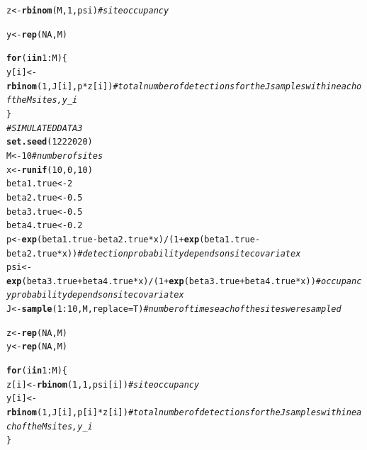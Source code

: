 \documentclass[12pt]{article}\usepackage[]{graphicx}\usepackage[]{color}
\makeatletter
\newcommand{\hlnum}[1]{\textcolor[rgb]{0.686,0.059,0.569}{#1}}%
\newcommand{\hlcom}[1]{\textcolor[rgb]{0.678,0.584,0.686}{\textit{#1}}}%
\newcommand{\hlopt}[1]{\textcolor[rgb]{0,0,0}{#1}}%
\newcommand{\hlstd}[1]{\textcolor[rgb]{0.345,0.345,0.345}{#1}}%
\newcommand{\hlkwa}[1]{\textcolor[rgb]{0.161,0.373,0.58}{\textbf{#1}}}%
\newcommand{\hlkwb}[1]{\textcolor[rgb]{0.69,0.353,0.396}{#1}}%
\newcommand{\hlkwc}[1]{\textcolor[rgb]{0.333,0.667,0.333}{#1}}%
\newcommand{\hlkwd}[1]{\textcolor[rgb]{0.737,0.353,0.396}{\textbf{#1}}}%
\newenvironment{kframe}{%
 \def\at@end@of@kframe{}%
 \ifinner\ifhmode%
  \def\at@end@of@kframe{\end{minipage}}%
  \begin{minipage}{\columnwidth}%
 \fi\fi%
 \def\FrameCommand##1{\hskip\@totalleftmargin \hskip-\fboxsep
 \colorbox{shadecolor}{##1}\hskip-\fboxsep
     \hskip-\linewidth \hskip-\@totalleftmargin \hskip\columnwidth}%
 \MakeFramed {\advance\hsize-\width
   \@totalleftmargin\z@ \linewidth\hsize
   \@setminipage}}%
 {\par\unskip\endMakeFramed%
 \at@end@of@kframe}
\newenvironment{knitrout}{}{} %
\newcommand{\hlnum}[1]{\textcolor[rgb]{0.686,0.059,0.569}{#1}}%
\newcommand{\hlcom}[1]{\textcolor[rgb]{0.678,0.584,0.686}{\textit{#1}}}%
\newcommand{\hlopt}[1]{\textcolor[rgb]{0,0,0}{#1}}%
\newcommand{\hlstd}[1]{\textcolor[rgb]{0.345,0.345,0.345}{#1}}%
\newcommand{\hlkwa}[1]{\textcolor[rgb]{0.161,0.373,0.58}{\textbf{#1}}}%
\newcommand{\hlkwb}[1]{\textcolor[rgb]{0.69,0.353,0.396}{#1}}%
\newcommand{\hlkwc}[1]{\textcolor[rgb]{0.333,0.667,0.333}{#1}}%
\newcommand{\hlkwd}[1]{\textcolor[rgb]{0.737,0.353,0.396}{\textbf{#1}}}%
\newenvironment{kframe}{%
 \def\at@end@of@kframe{}%
 \ifinner\ifhmode%
  \def\at@end@of@kframe{\end{minipage}}%
  \begin{minipage}{\columnwidth}%
 \fi\fi%
 \def\FrameCommand##1{\hskip\@totalleftmargin \hskip-\fboxsep
 \colorbox{shadecolor}{##1}\hskip-\fboxsep
     \hskip-\linewidth \hskip-\@totalleftmargin \hskip\columnwidth}%
 \MakeFramed {\advance\hsize-\width
   \@totalleftmargin\z@ \linewidth\hsize
   \@setminipage}}%
 {\par\unskip\endMakeFramed%
 \at@end@of@kframe}
\newenvironment{knitrout}{}{} %
\makeatother
\begin{document}
\begin{knitrout}
\begin{kframe}
\begin{alltt}
\hlstd{z} \hlkwb{<-} \hlkwd{rbinom}\hlstd{(M,} \hlnum{1}\hlstd{, psi)} \hlcom{# site occupancy}

\hlstd{y} \hlkwb{<-} \hlkwd{rep}\hlstd{(}\hlnum{NA}\hlstd{, M)}

\hlkwa{for}\hlstd{(i} \hlkwa{in} \hlnum{1}\hlopt{:}\hlstd{M)\{}
  \hlstd{y[i]} \hlkwb{<-} \hlkwd{rbinom}\hlstd{(}\hlnum{1}\hlstd{, J[i], p}\hlopt{*}\hlstd{z[i])} \hlcom{# total number of detections for the J samples within each of the M sites, y_i}
\hlstd{\}}
\hlcom{#SIMULATED DATA 3}
\hlkwd{set.seed}\hlstd{(}\hlnum{1222020}\hlstd{)}
\hlstd{M} \hlkwb{<-} \hlnum{10} \hlcom{# number of sites}
\hlstd{x} \hlkwb{<-} \hlkwd{runif}\hlstd{(}\hlnum{10}\hlstd{,} \hlnum{0}\hlstd{,} \hlnum{10}\hlstd{)}
\hlstd{beta1.true} \hlkwb{<-} \hlnum{2}
\hlstd{beta2.true} \hlkwb{<-} \hlnum{0.5}
\hlstd{beta3.true} \hlkwb{<-} \hlnum{0.5}
\hlstd{beta4.true} \hlkwb{<-} \hlnum{0.2}
\hlstd{p} \hlkwb{<-} \hlkwd{exp}\hlstd{(beta1.true} \hlopt{-} \hlstd{beta2.true}\hlopt{*}\hlstd{x)}\hlopt{/}\hlstd{(}\hlnum{1} \hlopt{+} \hlkwd{exp}\hlstd{(beta1.true} \hlopt{-} \hlstd{beta2.true}\hlopt{*}\hlstd{x))} \hlcom{# detection probability depends on site covariate x}
\hlstd{psi} \hlkwb{<-} \hlkwd{exp}\hlstd{(beta3.true} \hlopt{+} \hlstd{beta4.true}\hlopt{*}\hlstd{x)}\hlopt{/}\hlstd{(}\hlnum{1} \hlopt{+} \hlkwd{exp}\hlstd{(beta3.true} \hlopt{+} \hlstd{beta4.true}\hlopt{*}\hlstd{x))} \hlcom{# occupancy probability depends on site covariate x}
\hlstd{J} \hlkwb{<-} \hlkwd{sample}\hlstd{(}\hlnum{1}\hlopt{:}\hlnum{10}\hlstd{, M,} \hlkwc{replace} \hlstd{= T)} \hlcom{# number of times each of the sites were sampled}

\hlstd{z} \hlkwb{<-} \hlkwd{rep}\hlstd{(}\hlnum{NA}\hlstd{, M)}
\hlstd{y} \hlkwb{<-} \hlkwd{rep}\hlstd{(}\hlnum{NA}\hlstd{, M)}

\hlkwa{for}\hlstd{(i} \hlkwa{in} \hlnum{1}\hlopt{:}\hlstd{M)\{}
  \hlstd{z[i]} \hlkwb{<-} \hlkwd{rbinom}\hlstd{(}\hlnum{1}\hlstd{,} \hlnum{1}\hlstd{, psi[i])} \hlcom{#site occupancy}
  \hlstd{y[i]} \hlkwb{<-} \hlkwd{rbinom}\hlstd{(}\hlnum{1}\hlstd{, J[i], p[i]}\hlopt{*}\hlstd{z[i])} \hlcom{# total number of detections for the J samples within each of the M sites, y_i}
\hlstd{\}}
\end{alltt}
\end{kframe}
\end{knitrout}


\end{document}
